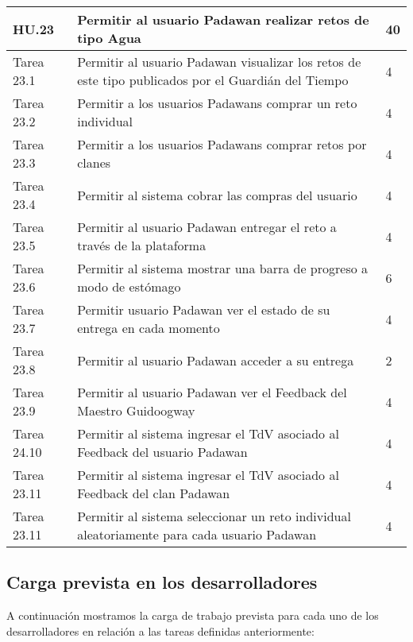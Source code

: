 \begin{table}[h]
	\centering
	\begin{tabular}{| p{2.3cm} | p{6.7cm} | p{2cm} |}
		\rowcolor[HTML]{329A9D} 
		{\color[HTML]{FFFFFF} \textbf{HU.23}} & {\color[HTML]{FFFFFF} \textbf{Permitir al usuario Padawan realizar retos de tipo Agua}} & {\color[HTML]{FFFFFF} \textbf{40}}  \\ \hline
		Tarea 23.1 & Permitir al usuario Padawan visualizar los retos de este tipo publicados por el Guardián del Tiempo & 4 \\ \hline
		Tarea 23.2 & Permitir a los usuarios Padawans comprar un reto individual & 4 \\ \hline
		Tarea 23.3 & Permitir a los usuarios Padawans comprar retos por clanes & 4 \\ \hline
		Tarea 23.4 & Permitir al sistema cobrar las compras del usuario & 4 \\ \hline
		Tarea 23.5 & Permitir al usuario Padawan entregar el reto a través de la plataforma & 4 \\ \hline
		Tarea 23.6 & Permitir al sistema mostrar una barra de progreso a modo de estómago & 6 \\ \hline
		Tarea 23.7 & Permitir usuario Padawan ver el estado de su entrega en cada momento & 4 \\ \hline
		Tarea 23.8 & Permitir al usuario Padawan acceder a su entrega & 2 \\ \hline
		Tarea 23.9 & Permitir al usuario Padawan ver el Feedback del Maestro Guidoogway & 4 \\ \hline
		Tarea 24.10 & Permitir al sistema ingresar el TdV asociado al Feedback del usuario Padawan & 4 \\
		 \hline
		Tarea 23.11 & Permitir al sistema ingresar el TdV asociado al Feedback del clan Padawan & 4 \\ \hline
		Tarea 23.11 & Permitir al sistema seleccionar un reto individual aleatoriamente para cada usuario Padawan & 4 \\ \hline
	\end{tabular}
\end{table}

\newpage

\subsection{Carga prevista en los desarrolladores}

A continuación mostramos la carga de trabajo prevista para cada uno de los desarrolladores en relación a las tareas definidas anteriormente:

